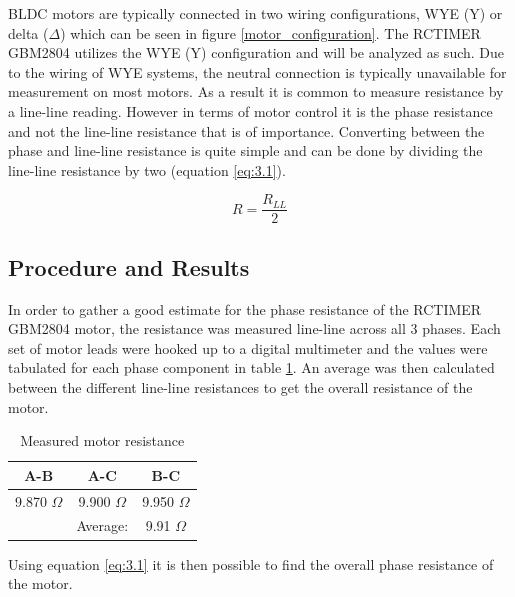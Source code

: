 BLDC motors are typically connected in two wiring configurations, WYE (Y) or delta (\(\Delta \)) which can be seen in figure \ref{motor_configuration}. The RCTIMER GBM2804 utilizes the WYE (Y) configuration and will be analyzed as such. Due to the wiring of WYE systems, the neutral connection is typically unavailable for measurement on most motors. As a result it is common to measure resistance by a line-line reading. However in terms of motor control it is the phase resistance and not the line-line resistance that is of importance. Converting between the phase and line-line resistance is quite simple and can be done by dividing the line-line resistance by two (equation \ref{eq:3.1}).

\begin{equation} \label{eq:3.1}
R = \frac{R_{LL}}{2}
\end{equation}

\subsection{Procedure and Results}

In order to gather a good estimate for the phase resistance of the RCTIMER GBM2804 motor, the resistance was measured line-line across all 3 phases. Each set of motor leads were hooked up to a digital multimeter and the values were tabulated for each phase component in table \ref{table3}. An average was then calculated between the different line-line resistances to get the overall resistance of the motor.

\begin{table}[ht]
	\begin{center}
		\caption{Measured motor resistance}
		\begin{tabular}[c]{|c|c|c|}
			
			\hline
			\textbf{A-B} & \textbf{A-C} & \textbf{B-C}\\
			
			\hline
			9.870 \(\Omega\)  & 9.900  \(\Omega\) & 9.950 \(\Omega\) \\
			
			\hline
			& Average: & 9.91 \(\Omega\) \\
			
			\hline
			\end{tabular}
			
			\label{table3}
			\end{center}
			\end{table}

Using equation \ref{eq:3.1} it is then possible to find the overall phase resistance of the motor.

